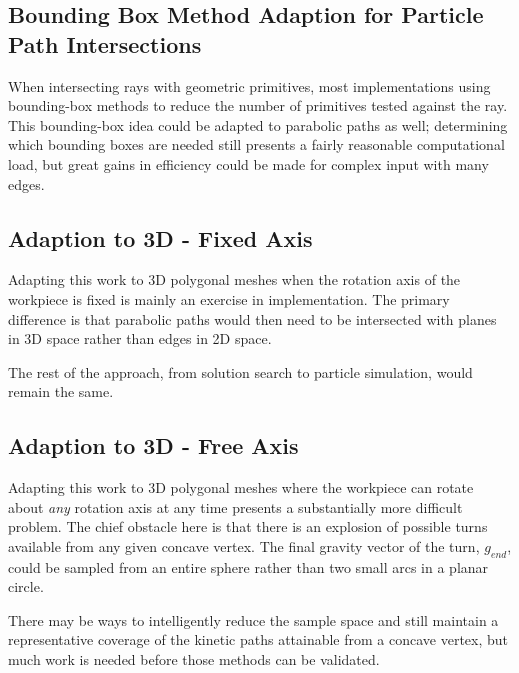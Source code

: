   \subsection{Bounding Box Method Adaption for Particle Path Intersections}

When intersecting rays with geometric primitives, most implementations using bounding-box methods to reduce the number of primitives tested against the ray. This bounding-box idea could be adapted to parabolic paths as well; determining which bounding boxes are needed still presents a fairly reasonable computational load, but great gains in efficiency could be made for complex input with many edges.

  \subsection{Adaption to 3D - Fixed Axis}

Adapting this work to 3D polygonal meshes when the rotation axis of the workpiece is fixed is mainly an exercise in implementation. The primary difference is that parabolic paths would then need to be intersected with planes in 3D space rather than edges in 2D space.

The rest of the approach, from solution search to particle simulation, would remain the same.

  \subsection{Adaption to 3D - Free Axis}

Adapting this work to 3D polygonal meshes where the workpiece can rotate about \emph{any} rotation axis at any time presents a substantially more difficult problem. The chief obstacle here is that there is an explosion of possible turns available from any given concave vertex. The final gravity vector of the turn, $g_{end}$, could be sampled from an entire sphere rather than two small arcs in a planar circle.

There may be ways to intelligently reduce the sample space and still maintain a representative coverage of the kinetic paths attainable from a concave vertex, but much work is needed before those methods can be validated.

